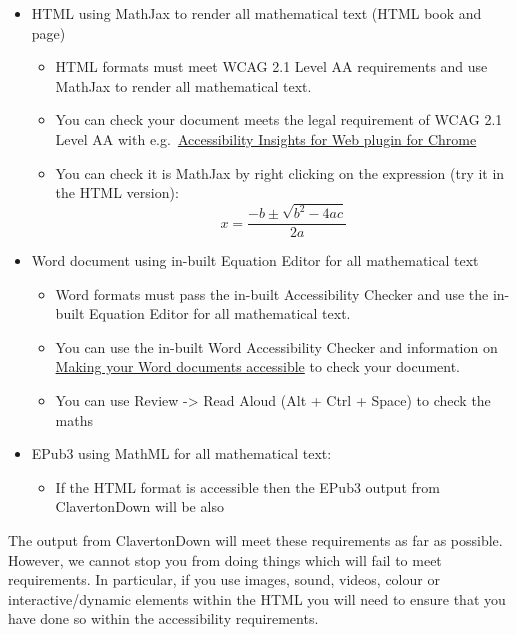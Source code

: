 \documentclass[
  12pt,
  a4paper]{extarticle}
\providecommand{\tightlist}{%
  \setlength{\itemsep}{0pt}\setlength{\parskip}{0pt}}
\theoremstyle{plain}
\theoremstyle{definition}
\theoremstyle{plain}
\theoremstyle{plain}
\theoremstyle{plain}
\theoremstyle{plain}
\theoremstyle{definition}
\theoremstyle{definition}
\theoremstyle{remark}
\theoremstyle{remark}
\renewcommand{\;}{\,}
\begin{document}
\begin{itemize}
\tightlist
\item
  HTML using MathJax to render all mathematical text (HTML book and page)

  \begin{itemize}
  \tightlist
  \item
    HTML formats must meet WCAG 2.1 Level AA requirements and use MathJax to render all mathematical text.
  \item
    You can check your document meets the legal requirement of WCAG 2.1 Level AA with e.g.~\href{https://accessibilityinsights.io/docs/en/web/overview}{Accessibility Insights for Web plugin for Chrome}
  \item
    You can check it is MathJax by right clicking on the expression (try it in the HTML version):
    \[x = \frac{-b\pm\sqrt{b^2 - 4ac}}{2a}\]
  \end{itemize}
\item
  Word document using in-built Equation Editor for all mathematical text

  \begin{itemize}
  \tightlist
  \item
    Word formats must pass the in-built Accessibility Checker and use the in-built Equation Editor for all mathematical text.
  \item
    You can use the in-built Word Accessibility Checker and information on \href{https://support.office.com/en-gb/article/make-your-word-documents-accessible-to-people-with-disabilities-d9bf3683-87ac-47ea-b91a-78dcacb3c66d}{Making your Word documents accessible} to check your document.
  \item
    You can use Review -\textgreater{} Read Aloud (Alt + Ctrl + Space) to check the maths
  \end{itemize}
\item
  EPub3 using MathML for all mathematical text:

  \begin{itemize}
  \tightlist
  \item
    If the HTML format is accessible then the EPub3 output from ClavertonDown will be also
  \end{itemize}
\end{itemize}

The output from ClavertonDown will meet these requirements as far as possible. However, we cannot stop you from doing things which will fail to meet requirements. In particular, if you use images, sound, videos, colour or interactive/dynamic elements within the HTML you will need to ensure that you have done so within the accessibility requirements.
\end{document}

